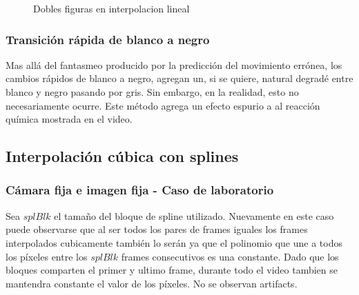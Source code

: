 \begin{figure}[H]
    \centering
    \caption{Dobles figuras en interpolacion lineal}
    \label{fig:artifact}
\end{figure}

\subsubsection{Transición rápida de blanco a negro}
Mas allá del fantasmeo producido por la predicción del movimiento errónea, los cambios rápidos de blanco a negro, agregan un, si se quiere, natural degradé entre blanco y negro pasando por gris. Sin embargo, en la realidad, esto no necesariamente ocurre. Este método agrega un efecto espurio a al reacción química mostrada en el video.


\subsection{Interpolación cúbica con splines}
\subsubsection{Cámara fija e imagen fija - Caso de laboratorio}
Sea $splBlk$ el tamaño del bloque de spline utilizado. Nuevamente en este caso puede observarse que al ser todos los pares de frames iguales los frames interpolados cubicamente también lo serán ya que el polinomio que une a todos los píxeles entre los $splBlk$ frames consecutivos es una constante. Dado que los bloques comparten el primer y ultimo frame, durante todo el video tambien se mantendra constante el valor de los píxeles. No se observan artifacts.

